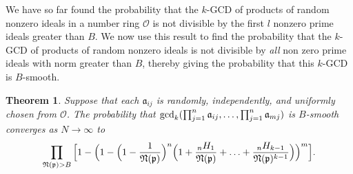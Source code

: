 \documentclass[12pt]{amsart}
\newtheorem{theorem}{Theorem}[subsection]
\theoremstyle{definition}
\newcommand{\f}[1]{\mathfrak{#1}}
\begin{document}
We have so far found the probability that the $k$-GCD of products of random nonzero ideals in a number ring $\mathcal{O}$ is not divisible by the first \(l\) nonzero prime ideals greater than \(B\). We now use this result to find the probability that the $k$-GCD of products of random nonzero ideals is not divisible by \textit{all} non zero prime ideals with norm greater than $B$, thereby giving the probability that this $k$-GCD is $B$-smooth.

\begin{theorem}
Suppose that each $\f{a}_{ij}$ is randomly, independently, and uniformly chosen from $\mathcal{O}$. The probability that $\gcd_k(\prod_{j=1}^{n}\f{a}_{ij},\mathellipsis,\prod_{j=1}^{n}\f{a}_{mj})$ is $B$-smooth converges as $N\to\infty$ to $$\prod_{\f{N}(\f{p})>B} \Big[1 - \Big(1 -\Big(1-\frac{1}{\f{N}(\f{p})}\Big)^n\Big(1+\frac{{}_nH_1}{\f{N}(\f{p})}+\mathellipsis+\frac{{}_nH_{k-1}}{\f{N}(\f{p})^{k-1}}\Big)\Big)^m\Big].$$
\end{theorem}
\end{document}
